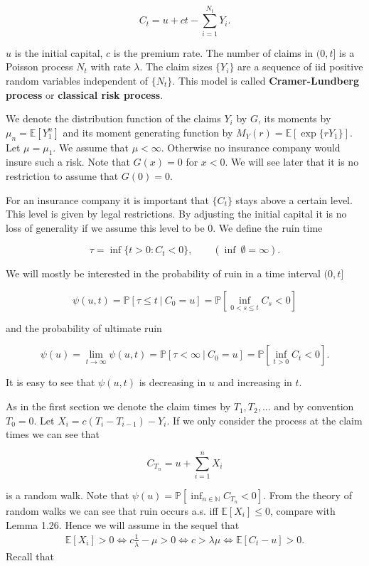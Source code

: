 \documentclass[a4paper,10pt,openany]{book}
\begin{document}
\[
C_t=u+ct-\sum_{i=1}^{N_t}Y_i.
\]

\(u\) is the initial capital, \(c\) is the premium rate. The number of claims in \((0,t]\) is a Poisson process \(N_t\) with rate \(\lambda\). The claim sizes \(\{Y_i\}\) are a sequence of iid positive random variables independent of \(\{N_t\}\). This model is called \textbf{Cramer-Lundberg process} or \textbf{classical risk process}.

We denote the distribution function of the claims \(Y_i\) by \(G\), its moments by \(\mu_n = \mathbb E [Y_1^n]\) and its moment generating function by \(M_Y (r) = \mathbb E [\exp\{rY_1\}]\). Let \(\mu = \mu_1\). We assume that \(\mu < \infty\). Otherwise no insurance company would insure such a risk. Note that \(G(x) = 0\) for \(x < 0\). We will see later that it is no restriction to assume that \(G(0) = 0\).

For an insurance company it is important that \(\{C_t\}\) stays above a certain level. This level is given by legal restrictions. By adjusting the initial capital it is no loss of generality if we assume this level to be 0. We define the ruin time

\[
\tau = \inf\{t>0 : C_t< 0\},\qquad (\inf\ \emptyset =\infty).
\]

We will mostly be interested in the probability of ruin in a time interval \((0, t]\)

\[
\psi(u,t)=\mathbb P [\tau \le t\ \vert\ C_0=u]=\mathbb P\left[\inf_{0<s\le t} C_s<0\right]
\]

and the probability of ultimate ruin

\[
\psi(u)=\lim_{t\to \infty}\psi(u,t) =\mathbb P [\tau <\infty\ \vert\ C_0=u]=\mathbb P\left[\inf_{t>0} C_t<0\right].
\]

It is easy to see that \(\psi(u, t)\) is decreasing in \(u\) and increasing in \(t\).

As in the first section we denote the claim times by \(T_1,T_2,...\) and by convention \(T_0 = 0\). Let \(X_i = c(T_i − T_{i−1}) − Y_i\). If we only consider the process at the claim times we can see that

\[
C_{T_n}=u+\sum_{i=1}^n X_i
\]

is a random walk. Note that \(\psi (u)=\mathbb P[\inf_{n\in\mathbb N}C_{T_n}<0]\). From the theory of random walks we can see that ruin occurs a.s. iff \(\mathbb E [X_i] \le 0\), compare with Lemma 1.26. Hence we will assume in the sequel that
\begin{align*}
\mathbb E[X_i]>0\iff c\frac{1}{\lambda}-\mu>0\iff c> \lambda\mu\iff \mathbb E[C_t-u]>0.
\end{align*}
Recall that
\end{document}
